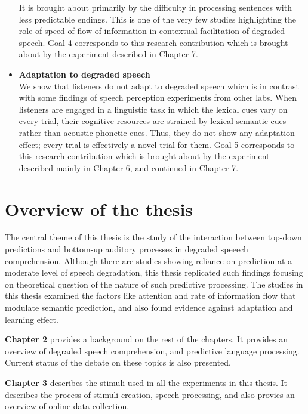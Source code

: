 \documentclass[a4paper, nobind]{templates/ociamthesis}
\begin{document}
\begin{itemize}
  It is brought about primarily by the difficulty in processing sentences with less predictable endings.
  This is one of the very few studies highlighting the role of speed of flow of information in contextual facilitation of degraded speech.
  Goal 4 corresponds to this research contribution which is brought about by the experiment described in Chapter 7.
\item
  \textbf{Adaptation to degraded speech}\\
  We show that listeners do not adapt to degraded speech which is in contrast with some findings of speech perception experiments from other labs.
  When listeners are engaged in a linguistic task in which the lexical cues vary on every trial, their cognitive resources are strained by lexical-semantic cues rather than acoustic-phonetic cues.
  Thus, they do not show any adaptation effect; every trial is effectively a novel trial for them.
  Goal 5 corresponds to this research contribution which is brought about by the experiment described mainly in Chapter 6, and continued in Chapter 7.
\end{itemize}

\hypertarget{overview-of-the-thesis}{%
\section{Overview of the thesis}\label{overview-of-the-thesis}}

The central theme of this thesis is the study of the interaction between top-down predictions and bottom-up auditory processes in degraded speeech comprehension.
Although there are studies showing reliance on prediction at a moderate level of speech degradation,
this thesis replicated such findings focusing on theoretical question of the nature of such predictive processing.
The studies in this thesis examined the factors like attention and rate of information flow that modulate semantic prediction,
and also found evidence against adaptation and learning effect.

\textbf{Chapter 2} provides a background on the rest of the chapters.
It provides an overview of degraded speech comprehension, and predictive language processing.
Current status of the debate on these topics is also presented.

\textbf{Chapter 3} describes the stimuli used in all the experiments in this thesis.
It describes the process of stimuli creation, speech processing, and also provies an overview of online data collection.
\end{document}
